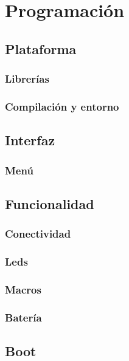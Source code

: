 \chapter{Programación}

\section{Plataforma}
\subsection{Librerías}
\subsection{Compilación y entorno}

\section{Interfaz}
\subsection{Menú}

\section{Funcionalidad}
\subsection{Conectividad}
\subsection{Leds}
\subsection{Macros}
\subsection{Batería}

\section{Boot}